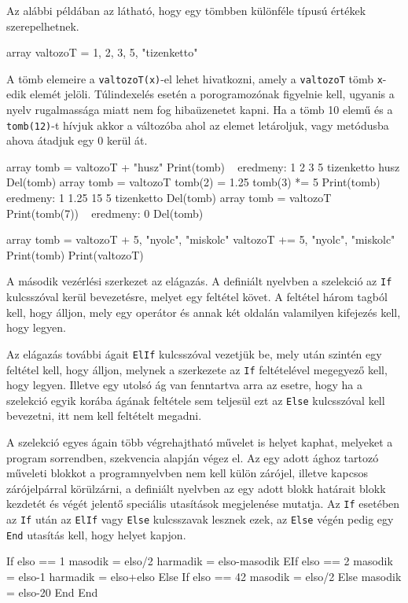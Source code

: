Az alábbi példában az látható, hogy egy tömbben különféle típusú értékek szerepelhetnek.
\begin{cpp}
array valtozoT = {1, 2, 3, 5, "tizenketto"}
\end{cpp}
A tömb elemeire a \texttt{valtozoT(x)}-el lehet hivatkozni, amely a \texttt{valtozoT} tömb \texttt{x}-edik elemét jelöli.
Túlindexelés esetén a porogramozónak figyelnie kell, ugyanis a nyelv rugalmassága miatt nem fog hibaüzenetet kapni. Ha a tömb 10 elemű és a \texttt{tomb(12)}-t hívjuk akkor a változóba ahol az elemet letároljuk, vagy metódusba ahova átadjuk egy 0 kerül át.
\begin{cpp}
array tomb = valtozoT + "husz"
Print(tomb) ~ eredmeny: 1 2 3 5 tizenketto husz
Del(tomb)
array tomb = valtozoT
tomb(2) = 1.25
tomb(3) *= 5
Print(tomb) ~ eredmeny: 1 1.25 15 5 tizenketto
Del(tomb)
array tomb = valtozoT
Print(tomb(7)) ~ eredmeny: 0
Del(tomb)

array tomb = valtozoT + {5, "nyolc", "miskolc"}
valtozoT += {5, "nyolc", "miskolc"}
Print(tomb)
Print(valtozoT)
\end{cpp}


A második vezérlési szerkezet az elágazás. A definiált nyelvben a szelekció az \texttt{If} kulcsszóval kerül bevezetésre, melyet egy feltétel követ. A feltétel három tagból kell, hogy álljon, mely egy operátor és annak két oldalán valamilyen kifejezés kell, hogy legyen.

Az elágazás további ágait \texttt{ElIf} kulcsszóval vezetjük be, mely után szintén egy feltétel kell, hogy álljon, melynek a szerkezete az \texttt{If} feltételével megegyező kell, hogy legyen. Illetve egy utolsó ág van fenntartva arra az esetre, hogy ha a szelekció egyik korába ágának feltétele sem teljesül ezt az \texttt{Else} kulcsszóval kell bevezetni, itt nem kell feltételt megadni.

A szelekció egyes ágain több végrehajtható művelet is helyet kaphat, melyeket a program sorrendben, szekvencia alapján végez el. Az egy adott ághoz tartozó műveleti blokkot a programnyelvben nem kell külön zárójel, illetve kapcsos zárójelpárral körülzárni, a definiált nyelvben az egy adott blokk határait blokk kezdetét és végét jelentő speciális utasítások megjelenése mutatja. Az \texttt{If} esetében az \texttt{If} után az \texttt{ElIf} vagy \texttt{Else} kulcsszavak lesznek ezek, az \texttt{Else} végén pedig egy \texttt{End} utasítás kell, hogy helyet kapjon.
\begin{cpp}
If elso == 1
	masodik = elso/2
	harmadik = elso-masodik
EIf elso == 2
	masodik = elso-1
	harmadik =  elso+elso
Else
	If elso == 42
		masodik = elso/2
	Else
		masodik = elso-20
	End
End
\end{cpp}

